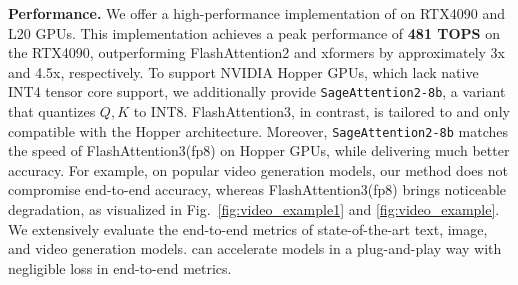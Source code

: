 \noindent\textbf{{Performance.}} We offer a high-performance implementation of \our on RTX4090 and L20 GPUs. This implementation achieves a peak performance of \textbf{481 TOPS} on the RTX4090, outperforming FlashAttention2 and xformers by approximately 3x and 4.5x, respectively.
To support NVIDIA Hopper GPUs, which lack native INT4 tensor core support, we additionally provide \texttt{SageAttention2-8b}\xspace, a variant that quantizes $Q,K$ to INT8. FlashAttention3, in contrast, is tailored to and only compatible with the Hopper architecture. Moreover, \texttt{SageAttention2-8b}\xspace matches the speed of FlashAttention3(fp8) on Hopper GPUs, while delivering much better accuracy. For example, on popular video generation models, our method does not compromise end-to-end accuracy, whereas FlashAttention3(fp8) brings noticeable degradation, as visualized in Fig.~\ref{fig:video_example1} and \ref{fig:video_example}.
We extensively evaluate the end-to-end metrics of state-of-the-art text, image, and video generation models. \our can accelerate models in a plug-and-play way with negligible loss in end-to-end metrics.


